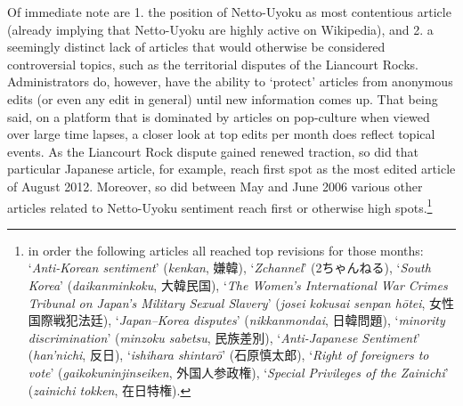 \documentclass[10pt,british,A4paper,twoside]{memoir}
\begin{document}
Of immediate note are 1. the position of Netto-Uyoku as  most
contentious article (already implying that Netto-Uyoku are highly active
on Wikipedia), and 2. a seemingly distinct lack of articles that would
otherwise be considered controversial topics, such as the territorial
disputes of the Liancourt Rocks. Administrators do, however, have the
ability to `protect' articles from anonymous edits (or even any edit in
general) until new information comes up. That being said, on a platform
that is dominated by articles on pop-culture when viewed over large time
lapses, a closer look at top edits per month does reflect topical
events. As the Liancourt Rock dispute gained renewed traction, so did that particular
Japanese article, for example, reach first spot
as the most edited article of August 2012. Moreover, so did between May
and June 2006 various other articles related to Netto-Uyoku sentiment
reach first or otherwise high spots.\footnote{in order the following
  articles all reached top revisions for those months:
  `\emph{Anti-Korean sentiment}' (\emph{kenkan}, 嫌韓),
  `\emph{Zchannel}' (2ちゃんねる), `\emph{South Korea}'
  (\emph{daikanminkoku}, 大韓民国), `\emph{The Women's International War
  Crimes Tribunal on Japan's Military Sexual Slavery}' (\emph{josei
  kokusai senpan hōtei}, 女性国際戦犯法廷), `\emph{Japan--Korea
  disputes}' (\emph{nikkanmondai}, 日韓問題), `\emph{minority
  discrimination}' (\emph{minzoku sabetsu}, 民族差別),
  `\emph{Anti-Japanese Sentiment}' (\emph{han'nichi}, 反日),
  `\emph{ishihara shintarō}' (石原慎太郎), `\emph{Right of foreigners to
  vote}' (\emph{gaikokuninjinseiken}, 外国人参政権), `\emph{Special
  Privileges of the Zainichi}' (\emph{zainichi tokken}, 在日特権).}
\end{document}

